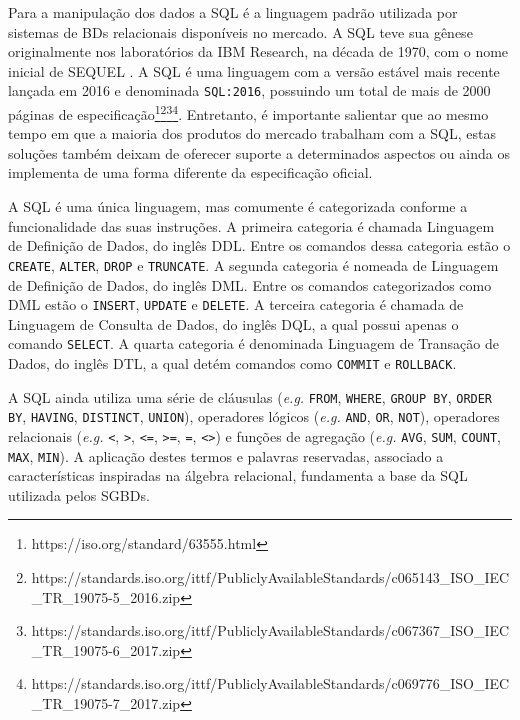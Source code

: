 Para a manipulação dos dados a \ac{SQL} é a linguagem padrão utilizada por sistemas de \acp{BD} relacionais disponíveis no mercado. 
A \ac{SQL} teve sua gênese originalmente nos laboratórios da IBM Research, na década de 1970, com o nome inicial de SEQUEL \cite{Chamberlin:1974}.
A \ac{SQL} é uma linguagem com a versão estável mais recente lançada em 2016 e denominada \texttt{SQL:2016}, possuindo um total de mais de 2000 páginas de especificação\footnote{https://iso.org/standard/63555.html}\footnote{https://standards.iso.org/ittf/PubliclyAvailableStandards/c065143_ISO_IEC_TR_19075-5_2016.zip}\footnote{https://standards.iso.org/ittf/PubliclyAvailableStandards/c067367_ISO_IEC_TR_19075-6_2017.zip}\footnote{https://standards.iso.org/ittf/PubliclyAvailableStandards/c069776_ISO_IEC_TR_19075-7_2017.zip}. 
Entretanto, é importante salientar que ao mesmo tempo em que a maioria dos produtos do mercado trabalham com a \ac{SQL}, estas soluções também deixam de oferecer suporte a determinados aspectos ou ainda os implementa de uma forma diferente da especificação oficial. 

A \ac{SQL} é uma única linguagem, mas comumente é categorizada conforme a funcionalidade das suas instruções. 
A primeira categoria é chamada Linguagem de Definição de Dados, do inglês \ac{DDL}. 
Entre os comandos dessa categoria estão o \texttt{CREATE}, \texttt{ALTER}, \texttt{DROP} e \texttt{TRUNCATE}. 
A segunda categoria é nomeada de Linguagem de Definição de Dados, do inglês \ac{DML}. 
Entre os comandos categorizados como \ac{DML} estão o \texttt{INSERT}, \texttt{UPDATE} e \texttt{DELETE}. 
A terceira categoria é chamada de Linguagem de Consulta de Dados, do inglês \ac{DQL}, a qual possui apenas o comando \texttt{SELECT}. 
A quarta categoria é denominada Linguagem de Transação de Dados, do inglês \ac{DTL}, a qual detém comandos como \texttt{COMMIT} e \texttt{ROLLBACK}.

A \ac{SQL} ainda utiliza uma série de cláusulas (\textit{e.g.} \texttt{FROM}, \texttt{WHERE}, \texttt{GROUP BY}, \texttt{ORDER BY}, \texttt{HAVING}, \texttt{DISTINCT}, \texttt{UNION}), operadores lógicos (\textit{e.g.} \texttt{AND}, \texttt{OR}, \texttt{NOT}), operadores relacionais (\textit{e.g.} \texttt{<}, \texttt{>}, \texttt{<=}, \texttt{>=}, \texttt{=}, \texttt{<>}) e funções de agregação (\textit{e.g.} \texttt{AVG}, \texttt{SUM}, \texttt{COUNT}, \texttt{MAX}, \texttt{MIN}). 
A aplicação destes termos e palavras reservadas, associado a características inspiradas na álgebra relacional, fundamenta a base da \ac{SQL} utilizada pelos \acp{SGBD}.

